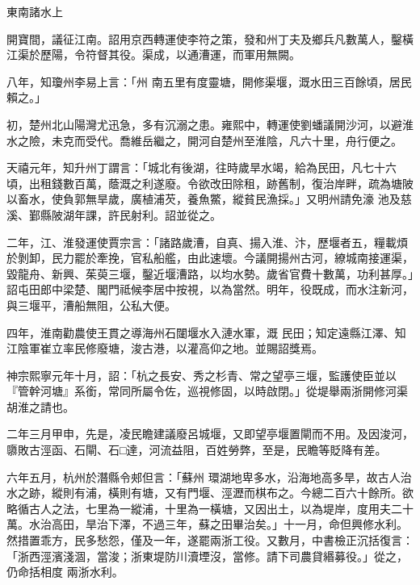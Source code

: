 
\begin{pinyinscope}

 東南諸水上



 開寶間，議征江南。詔用京西轉運使李符之策，發和州丁夫及鄉兵凡數萬人，鑿橫江渠於歷陽，令符督其役。渠成，以通漕運，而軍用無闕。



 八年，知瓊州李易上言：「州
 南五里有度靈塘，開修渠堰，溉水田三百餘頃，居民賴之。」



 初，楚州北山陽灣尤迅急，多有沉溺之患。雍熙中，轉運使劉蟠議開沙河，以避淮水之險，未克而受代。喬維岳繼之，開河自楚州至淮陰，凡六十里，舟行便之。



 天禧元年，知升州丁謂言：「城北有後湖，往時歲旱水竭，給為民田，凡七十六頃，出租錢數百萬，蔭溉之利遂廢。令欲改田除租，跡舊制，復治岸畔，疏為塘陂以畜水，使負郭無旱歲，廣植浦芡，養魚鱉，縱貧民漁採。」又明州請免濠
 池及慈溪、鄞縣陂湖年課，許民射利。詔並從之。



 二年，江、淮發運使賈宗言：「諸路歲漕，自真、揚入淮、汴，歷堰者五，糧載煩於剝卸，民力罷於牽挽，官私船艦，由此速壞。今議開揚州古河，繚城南接運渠，毀龍舟、新興、茱萸三堰，鑿近堰漕路，以均水勢。歲省官費十數萬，功利甚厚。」詔屯田郎中梁楚、閣門祗候李居中按視，以為當然。明年，役既成，而水注新河，與三堰平，漕船無阻，公私大便。



 四年，淮南勸農使王貫之導海州石闥堰水入漣水軍，溉
 民田；知定遠縣江澤、知江陰軍崔立率民修廢塘，浚古港，以灌高仰之地。並賜詔獎焉。



 神宗熙寧元年十月，詔：「杭之長安、秀之杉青、常之望亭三堰，監護使臣並以『管幹河塘』系銜，常同所屬令佐，巡視修固，以時啟閉。」從堤舉兩浙開修河渠胡淮之請也。



 二年三月甲申，先是，凌民瞻建議廢呂城堰，又即望亭堰置閘而不用。及因浚河，隳敗古涇函、石閘、石□達，河流益阻，百姓勞弊，至是，民瞻等貶降有差。



 六年五月，杭州於潛縣令郟但言：「蘇州
 環湖地卑多水，沿海地高多旱，故古人治水之跡，縱則有浦，橫則有塘，又有門堰、涇瀝而棋布之。今總二百六十餘所。欲略循古人之法，七里為一縱浦，十里為一橫塘，又因出土，以為堤岸，度用夫二十萬。水治高田，旱治下澤，不過三年，蘇之田畢治矣。」十一月，命但興修水利。然措置乖方，民多愁怨，僅及一年，遂罷兩浙工役。又數月，中書檢正沉括復言：「浙西涇濱淺涸，當浚；浙東堤防川瀆堙沒，當修。請下司農貸緡募役。」從之，仍命括相度
 兩浙水利。




\end{pinyinscope}

